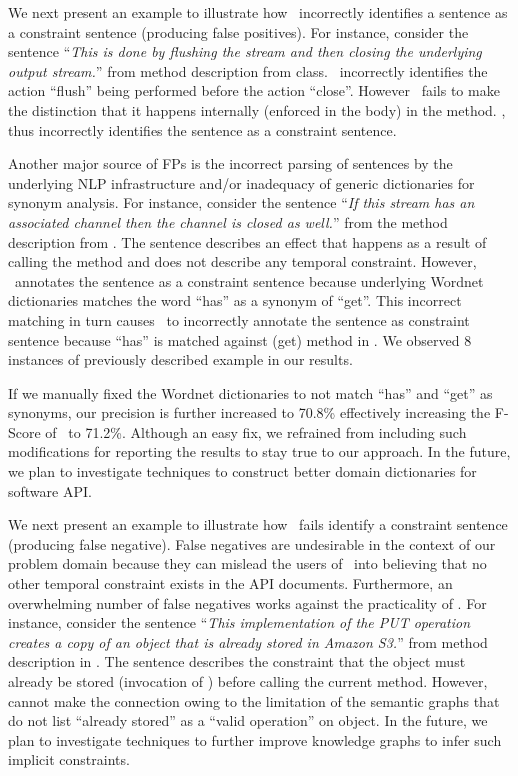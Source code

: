  

We next present an example to illustrate how \tool\ incorrectly identifies a sentence as a constraint sentence (producing false positives).
For instance, consider the sentence ``\textit{This is done by flushing the stream and then closing the underlying output stream.}'' from   method description from  class.
\tool\ incorrectly identifies the action ``flush'' being performed before the action ``close''.
However \tool\ fails to make the distinction that it happens internally (enforced in the body) in the method.
\tool, thus incorrectly identifies the sentence as a constraint sentence.   


Another major source of FPs is the incorrect parsing of sentences by the underlying NLP infrastructure
and/or inadequacy of generic dictionaries for synonym analysis.
For instance, consider the sentence ``\textit{If this stream has an associated channel then the channel is closed as well.}''
from the  method description from .
The sentence describes an effect that happens as a result of calling the  method and does not describe any temporal constraint.
However, \tool\ annotates the sentence as a constraint sentence because underlying Wordnet dictionaries matches the word ``has'' as a synonym of ``get''.
This incorrect matching in turn causes \tool\ to incorrectly annotate the sentence as constraint sentence
because ``has'' is matched against \CodeIn(get) method in .
We observed 8 instances of previously described example in our results.

If we manually fixed the Wordnet dictionaries to not match ``has'' and ``get'' as synonyms,
our precision is further increased to 70.8\% effectively increasing the F-Score of \tool\ to 71.2\%.
Although an easy fix, we refrained from including such modifications for reporting the results to stay true to our approach.
In the future, we plan to investigate techniques to construct better domain dictionaries for software API. 

We next present an example to illustrate how \tool\ fails identify a constraint sentence (producing false negative).
False negatives are undesirable in the context of our problem domain
because they can mislead the users of \tool\ into believing that no other temporal constraint exists in the API documents.
Furthermore, an overwhelming number of false negatives works against the practicality of \tool.
For instance, consider the sentence ``\textit{This implementation of the PUT operation creates a copy of an object that is already stored in Amazon S3.}''
from   method description in \amazonAPI.
The sentence describes the constraint that the object must already be stored (invocation of )
before calling the current method.
However, \tool cannot make the connection owing to the limitation of the semantic graphs that do not list ``already stored'' as a ``valid operation'' on object.  
In the future, we plan to investigate techniques to further improve knowledge graphs to infer such implicit constraints. 

